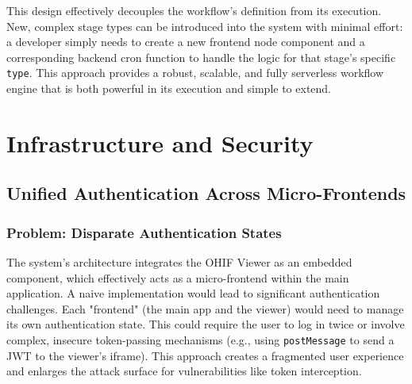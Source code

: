 This design effectively decouples the workflow's definition from its execution. New, complex stage types can be introduced into the system with minimal effort: a developer simply needs to create a new frontend node component and a corresponding backend cron function to handle the logic for that stage's specific \texttt{type}. This approach provides a robust, scalable, and fully serverless workflow engine that is both powerful in its execution and simple to extend.


\section{Infrastructure and Security}
\label{sec:infrastructure_security}

\subsection{Unified Authentication Across Micro-Frontends}
\label{subsec:unified_authentication}

\subsubsection{Problem: Disparate Authentication States}
The system's architecture integrates the OHIF Viewer as an embedded component, which effectively acts as a micro-frontend within the main application. A naive implementation would lead to significant authentication challenges. Each "frontend" (the main app and the viewer) would need to manage its own authentication state. This could require the user to log in twice or involve complex, insecure token-passing mechanisms (e.g., using \texttt{postMessage} to send a JWT to the viewer's iframe). This approach creates a fragmented user experience and enlarges the attack surface for vulnerabilities like token interception.


